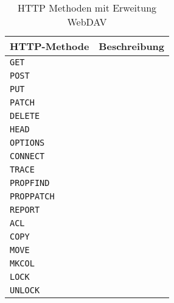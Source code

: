 \begin{table}[h]
  \centering
  \begin{tabular}{lp{7cm}}
    \toprule
    \textbf{HTTP-Methode} & \textbf{Beschreibung} \\
    \midrule
    \verb=GET= &  \\
    \verb=POST= & \\
    \verb=PUT= & \\
    \verb=PATCH= & \\
    \verb=DELETE= & \\
    \verb=HEAD= & \\
    \verb=OPTIONS= & \\
    \verb=CONNECT= & \\
    \verb=TRACE= & \\
    \verb=PROPFIND= & \\
    \verb=PROPPATCH= &  \\
    \verb=REPORT= & \\
    \verb=ACL= & \\
    \verb=COPY= & \\
    \verb=MOVE= & \\
    \verb=MKCOL= & \\
    \verb=LOCK= & \\
    \verb=UNLOCK= & \\
    \bottomrule
  \end{tabular}
  
  \caption{HTTP Methoden mit Erweitung WebDAV}
  \medskip
  \label{tab:httpmethods}
\end{table}
